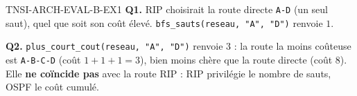 \begin{corrige}{TNSI-ARCH-EVAL-B-EX1}
\textbf{Q1.} RIP choisirait la route directe \texttt{A-D} (un seul saut), quel que soit son coût élevé. \lstinline{bfs_sauts(reseau, "A", "D")} renvoie $1$.

\textbf{Q2.} \lstinline{plus_court_cout(reseau, "A", "D")} renvoie $3$ : la route la moins coûteuse est \texttt{A-B-C-D} (coût $1+1+1=3$), bien moins chère que la route directe (coût $8$). Elle \textbf{ne coïncide pas} avec la route RIP : RIP privilégie le nombre de sauts, OSPF le coût cumulé.
\end{corrige}

